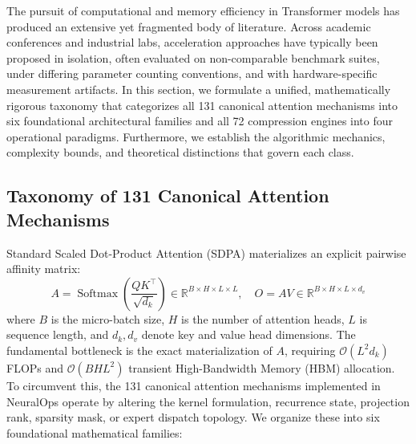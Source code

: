 \documentclass{article}
\begin{document}
The pursuit of computational and memory efficiency in Transformer models has produced an extensive yet fragmented body of literature. Across academic conferences and industrial labs, acceleration approaches have typically been proposed in isolation, often evaluated on non-comparable benchmark suites, under differing parameter counting conventions, and with hardware-specific measurement artifacts. In this section, we formulate a unified, mathematically rigorous taxonomy that categorizes all 131 canonical attention mechanisms into six foundational architectural families and all 72 compression engines into four operational paradigms. Furthermore, we establish the algorithmic mechanics, complexity bounds, and theoretical distinctions that govern each class.

\subsection{Taxonomy of 131 Canonical Attention Mechanisms}
Standard Scaled Dot-Product Attention (SDPA) \citep{vaswani2017attention} materializes an explicit pairwise affinity matrix:
\begin{equation}
    A = \operatorname{Softmax}\left(\frac{Q K^\top}{\sqrt{d_k}}\right) \in \mathbb{R}^{B \times H \times L \times L}, \quad O = A V \in \mathbb{R}^{B \times H \times L \times d_v}
\end{equation}
where $B$ is the micro-batch size, $H$ is the number of attention heads, $L$ is sequence length, and $d_k, d_v$ denote key and value head dimensions. The fundamental bottleneck is the exact materialization of $A$, requiring $\mathcal{O}(L^2 d_k)$ FLOPs and $\mathcal{O}(B H L^2)$ transient High-Bandwidth Memory (HBM) allocation. To circumvent this, the 131 canonical attention mechanisms implemented in NeuralOps operate by altering the kernel formulation, recurrence state, projection rank, sparsity mask, or expert dispatch topology. We organize these into six foundational mathematical families:
\end{document}

